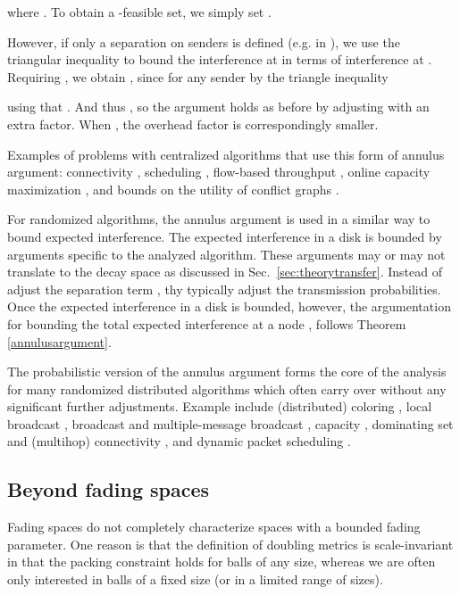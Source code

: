 \documentclass[11pt]{amsart}
\begin{document}
where .
To obtain a -feasible set, we simply set .


However, if only a separation on senders is defined (e.g. in \cite{us:talg12}), 
we use the triangular inequality to bound the interference at  in terms of interference at .
Requiring , we obtain , since for any sender  by the triangle inequality

using that .
And thus , so the argument holds as
before by adjusting  with an extra  factor.
When , the overhead factor is correspondingly smaller.


Examples of problems with centralized algorithms that use this form of annulus argument:
connectivity \cite{MoWa06,moscibroda06b,Moscibroda07,SODA12},
scheduling \cite{chafekar07,tonoyan2012},
flow-based throughput \cite{CKMPS08},
online capacity maximization \cite{fanghanel2013online},
and bounds on the utility of conflict graphs \cite{tonoyan2013,tonoyan2013a}.

For randomized algorithms, the annulus argument is used in 
a similar way to bound expected interference.  The expected
interference in a disk is bounded by arguments specific to the
analyzed algorithm.
 These arguments may or may not translate to the
decay space as discussed in Sec.~\ref{sec:theorytransfer}.
Instead of adjust the separation term , thy typically adjust the transmission probabilities.
Once the expected interference in a disk is bounded, however, the
argumentation for bounding the total expected interference at a node
,  follows Theorem \ref{annulusargument}.  





The probabilistic version of the annulus argument forms the core of
the analysis for many randomized distributed algorithms which often carry over without any significant further adjustments.
Example include (distributed) coloring \cite{YWHLa11}, local broadcast
\cite{Goussevskaia2008Local, Yu11, Yu12, FOMC12}, broadcast
\cite{DaumGKN13} and multiple-message broadcast \cite{YuHWTL12,
  YuHWYL13}, capacity \cite{pei2013distributed}, 
dominating set \cite{ScheidelerRS08} and (multihop) connectivity  \cite{PODC12, PODC13}, and dynamic packet scheduling \cite{pei2012low}.







\subsection{Beyond fading spaces}
Fading spaces do not completely characterize spaces with a
bounded fading parameter. One reason is that the definition of
doubling metrics is scale-invariant in that the packing
constraint holds for balls of any size, whereas we are often only
interested in balls of a fixed size (or in a limited range of sizes).
\end{document}
